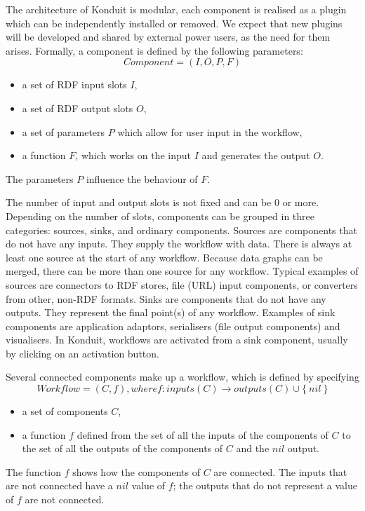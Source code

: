 The architecture of Konduit is modular, each component is realised as a plugin which can be independently installed or removed. We expect that new plugins will be developed and shared by external power users, as the need for them arises. 
Formally, a component is defined by the following parameters:
$$
Component = (I, O, P, F )
$$
\begin{itemize}
 \item a set of RDF input slots $I$,
 \item a set of RDF output slots $O$, 
 \item a set of parameters $P$ which allow for user input in the workflow, 
 \item a function $F$, which works on the input $I$ and generates the output $O$.
\end{itemize}
The parameters $P$ influence the behaviour of $F$.

The number of input and output slots is not fixed and can be 0 or more. Depending on the number of slots, components can be grouped in three categories: sources, sinks, and ordinary components. Sources are components that do not have any inputs. They supply the workflow with data. There is always at least one source at the start of any workflow. Because data graphs can be merged, there can be more than one source for any workflow. Typical examples of sources are connectors to RDF stores, file (URL) input components, or converters from other, non-RDF formats. Sinks are components that do not have any outputs. They represent the final point(s) of any workflow. Examples of sink components are application adaptors, serialisers (file output components) and visualisers. In Konduit, workflows are activated from a sink component, usually by clicking on an activation button.

Several connected components make up a workflow, which is defined by specifying
$$
Workflow = (C, f) , where f: inputs(C) \rightarrow outputs(C) \cup \{~nil~\}
$$
\begin{itemize}
 \item a set of components $C$,
 \item a function $f$ defined from the set of all the inputs of the components of $C$ to the set of all the outputs of the components of $C$ and the $nil$ output.
\end{itemize}
The function $f$ shows how the components of $C$ are connected. The inputs that are not connected have a $nil$ value of $f$; the outputs that do not represent a value of $f$ are not connected.

